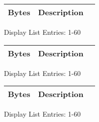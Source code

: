 \begin{minipage}[b]{0.31\linewidth}
\begin{figure}[H]
{
  \setlength{\tabcolsep}{3.0pt}
  \setlength\cmidrulewidth{\heavyrulewidth} %
    \begin{adjustbox}{height=8.5cm}

  \begin{tabular}{lll}
  \toprule
    Bytes       & Description                                                         \\
    \midrule
    
    \end{tabular}

  \end{adjustbox}

}\caption*{Display List Entries: 1-60}
\end{figure}
\end{minipage}
\hspace{0.1cm}
\begin{minipage}[b]{0.31\linewidth}
\begin{figure}[H]
{
  \setlength{\tabcolsep}{3.0pt}
  \setlength\cmidrulewidth{\heavyrulewidth} %
    \begin{adjustbox}{height=8.5cm}

  \begin{tabular}{lll}
  \toprule
    Bytes       & Description                                                         \\
    \midrule
    \end{tabular}

  \end{adjustbox}

}\caption*{Display List Entries: 1-60}
\end{figure}
\end{minipage}
\hspace{0.1cm}
\begin{minipage}[b]{0.31\linewidth}
\begin{figure}[H]
{
  \setlength{\tabcolsep}{3.0pt}
  \setlength\cmidrulewidth{\heavyrulewidth} %
    \begin{adjustbox}{height=8.5cm}

  \begin{tabular}{lll}
  \toprule
    Bytes       & Description                                                         \\
    \midrule
    \end{tabular}

  \end{adjustbox}

}\caption*{Display List Entries: 1-60}
\end{figure}
\end{minipage}
\hspace{0.1cm}
